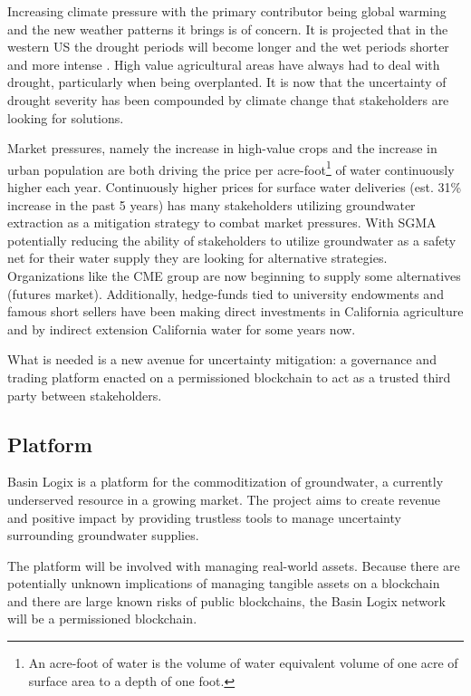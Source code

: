 \documentclass{tufte-handout}
\begin{document}
Increasing climate pressure with the primary contributor being global warming and the new weather patterns it brings is of concern. It is projected that in the western US the drought periods will become longer and the wet periods shorter and more intense \cite{Diffenbaugh2020}. High value agricultural areas have always had to deal with drought, particularly when being overplanted. It is now that the uncertainty of drought severity has been compounded by climate change that stakeholders are looking for solutions. 

Market pressures, namely the increase in high-value crops and the increase in urban population are both driving the price per acre-foot\footnote{An acre-foot of water is the volume of water equivalent volume of one acre of surface area to a depth of one foot.} of water continuously higher each year. Continuously higher prices for surface water deliveries (est. 31\% increase in the past 5 years)\cite{value} has many stakeholders utilizing groundwater extraction as a mitigation strategy to combat market pressures. With SGMA potentially reducing the ability of stakeholders to utilize groundwater as a safety net for their water supply they are looking for alternative strategies. Organizations like the CME group are now beginning to supply some alternatives (futures market). Additionally, hedge-funds tied to university endowments\cite{harvard} and famous short sellers\cite{burry} have been making direct investments in California agriculture and by indirect extension California water for some years now.

What is needed is a new avenue for uncertainty mitigation: a governance and trading platform enacted on a permissioned blockchain to act as a trusted third party between stakeholders. 

\subsection{Platform}\label{sec:headings}

Basin Logix is a platform for the commoditization of groundwater, a currently underserved resource in a growing market. The project aims to create revenue and positive impact by providing trustless tools to manage uncertainty surrounding groundwater supplies. 

The platform will be involved with managing real-world assets. Because there are potentially unknown implications of managing tangible assets on a blockchain and there are large known risks of public blockchains, the Basin Logix network will be a permissioned blockchain. 
\end{document}

